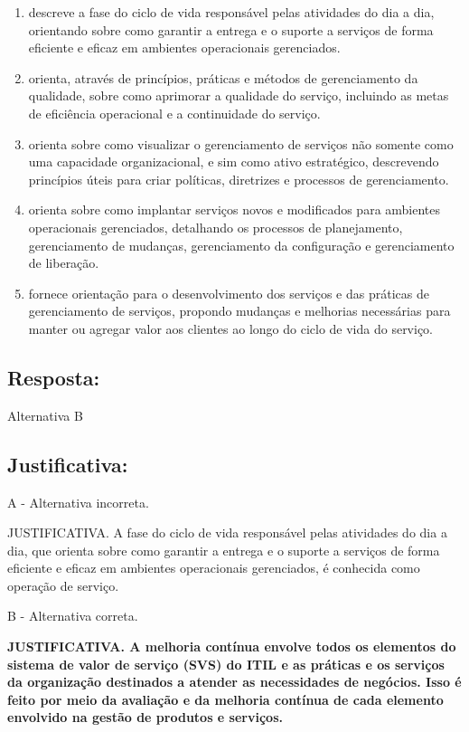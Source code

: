 \documentclass[
]{book}
\begin{document}
\begin{enumerate}
\def\labelenumi{\alph{enumi}.}
\item
  descreve a fase do ciclo de vida responsável pelas atividades do dia a dia, orientando sobre como garantir a entrega e o suporte a serviços de forma eficiente e eficaz em ambientes operacionais gerenciados.
\item
  orienta, através de princípios, práticas e métodos de gerenciamento da qualidade, sobre como aprimorar a qualidade do serviço, incluindo as metas de eficiência operacional e a continuidade do serviço.
\item
  orienta sobre como visualizar o gerenciamento de serviços não somente como uma capacidade organizacional, e sim como ativo estratégico, descrevendo princípios úteis para criar políticas, diretrizes e processos de gerenciamento.
\item
  orienta sobre como implantar serviços novos e modificados para ambientes operacionais gerenciados, detalhando os processos de planejamento, gerenciamento de mudanças, gerenciamento da configuração e gerenciamento de liberação.
\item
  fornece orientação para o desenvolvimento dos serviços e das práticas de gerenciamento de serviços, propondo mudanças e melhorias necessárias para manter ou agregar valor aos clientes ao longo do ciclo de vida do serviço.
\end{enumerate}

\subsection{Resposta:}\label{resposta}

Alternativa B

\subsection{Justificativa:}\label{justificativa-1}

A - Alternativa incorreta.

JUSTIFICATIVA. A fase do ciclo de vida responsável pelas atividades do dia a dia, que orienta sobre como garantir a entrega e o suporte a serviços de forma eficiente e eficaz em ambientes operacionais gerenciados, é conhecida como operação de serviço.

B - Alternativa correta.

\textbf{JUSTIFICATIVA. A melhoria contínua envolve todos os elementos do sistema de valor de serviço (SVS) do ITIL e as práticas e os serviços da organização destinados a atender as necessidades de negócios. Isso é feito por meio da avaliação e da melhoria contínua de cada elemento envolvido na gestão de produtos e serviços.}
\end{document}
